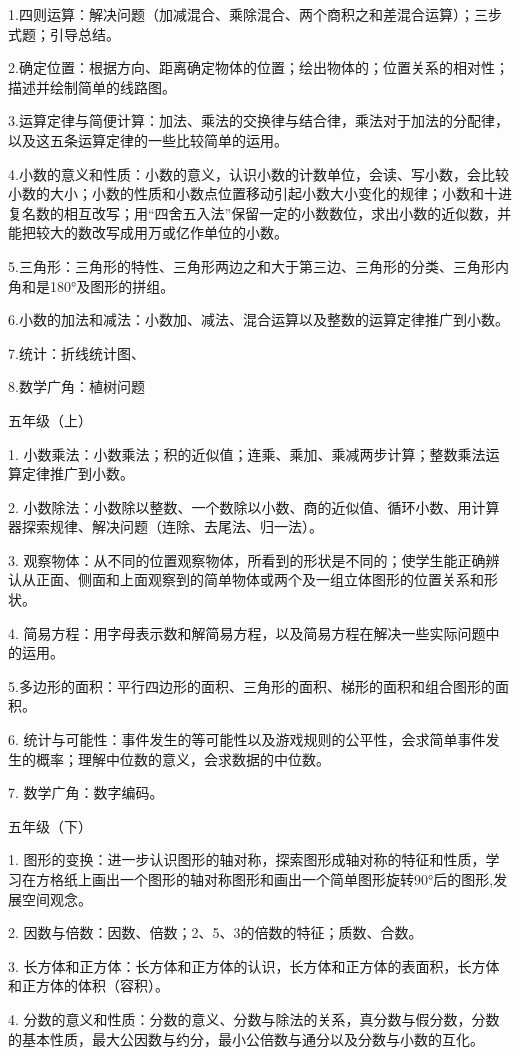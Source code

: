 1.四则运算：解决问题（加减混合、乘除混合、两个商积之和差混合运算）；三步式题；引导总结。

2.确定位置：根据方向、距离确定物体的位置；绘出物体的；位置关系的相对性；描述并绘制简单的线路图。

3.运算定律与简便计算：加法、乘法的交换律与结合律，乘法对于加法的分配律，以及这五条运算定律的一些比较简单的运用。

4.小数的意义和性质：小数的意义，认识小数的计数单位，会读、写小数，会比较小数的大小；小数的性质和小数点位置移动引起小数大小变化的规律；小数和十进复名数的相互改写；用“四舍五入法”保留一定的小数数位，求出小数的近似数，并能把较大的数改写成用万或亿作单位的小数。

5.三角形：三角形的特性、三角形两边之和大于第三边、三角形的分类、三角形内角和是180°及图形的拼组。

6.小数的加法和减法：小数加、减法、混合运算以及整数的运算定律推广到小数。

7.统计：折线统计图、

8.数学广角：植树问题

五年级（上）

1. 小数乘法：小数乘法；积的近似值；连乘、乘加、乘减两步计算；整数乘法运算定律推广到小数。

2. 小数除法：小数除以整数、一个数除以小数、商的近似值、循环小数、用计算器探索规律、解决问题（连除、去尾法、归一法）。

3. 观察物体：从不同的位置观察物体，所看到的形状是不同的；使学生能正确辨认从正面、侧面和上面观察到的简单物体或两个及一组立体图形的位置关系和形状。

4. 简易方程：用字母表示数和解简易方程，以及简易方程在解决一些实际问题中的运用。

5.多边形的面积：平行四边形的面积、三角形的面积、梯形的面积和组合图形的面积。

6. 统计与可能性：事件发生的等可能性以及游戏规则的公平性，会求简单事件发生的概率；理解中位数的意义，会求数据的中位数。

7. 数学广角：数字编码。

五年级（下）

1. 图形的变换：进一步认识图形的轴对称，探索图形成轴对称的特征和性质，学习在方格纸上画出一个图形的轴对称图形和画出一个简单图形旋转90°后的图形,发展空间观念。

2. 因数与倍数：因数、倍数；2、5、3的倍数的特征；质数、合数。

3. 长方体和正方体：长方体和正方体的认识，长方体和正方体的表面积，长方体和正方体的体积（容积）。

4. 分数的意义和性质：分数的意义、分数与除法的关系，真分数与假分数，分数的基本性质，最大公因数与约分，最小公倍数与通分以及分数与小数的互化。

